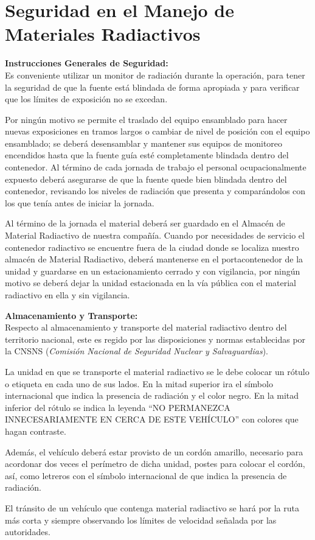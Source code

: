 \section*{Seguridad en el Manejo de Materiales Radiactivos}

\textbf{Instrucciones Generales de Seguridad:} \\
Es conveniente utilizar un monitor de radiación durante la operación, para tener la seguridad de que la fuente está blindada de forma apropiada y para verificar que los límites de exposición no se excedan.

Por ningún motivo se permite el traslado del equipo ensamblado para hacer nuevas exposiciones en tramos largos o cambiar de nivel de posición con el equipo ensamblado; se deberá desensamblar y mantener sus equipos de monitoreo encendidos hasta que la fuente guía esté completamente blindada dentro del contenedor. Al término de cada jornada de trabajo el personal ocupacionalmente expuesto deberá asegurarse de que la fuente quede bien blindada dentro del contenedor, revisando los niveles de radiación que presenta y comparándolos con los que tenía antes de iniciar la jornada.

Al término de la jornada el material deberá ser guardado en el Almacén de Material Radiactivo de nuestra compañía. Cuando por necesidades de servicio el contenedor radiactivo se encuentre fuera de la ciudad donde se localiza nuestro almacén de Material Radiactivo, deberá mantenerse en el portacontenedor de la unidad y guardarse en un estacionamiento cerrado y con vigilancia, por ningún motivo se deberá dejar la unidad estacionada en la vía pública con el material radiactivo en ella y sin vigilancia.

\textbf{Almacenamiento y Transporte:} \\
Respecto al almacenamiento y transporte del material radiactivo dentro del territorio nacional, este es regido por las disposiciones y normas establecidas por la CNSNS (\textit{Comisión Nacional de Seguridad Nuclear y Salvaguardias}).

La unidad en que se transporte el material radiactivo se le debe colocar un rótulo o etiqueta en cada uno de sus lados. En la mitad superior ira el símbolo internacional que indica la presencia de radiación y el color negro. En la mitad inferior del rótulo se indica la leyenda ``NO PERMANEZCA INNECESARIAMENTE EN CERCA DE ESTE VEHÍCULO'' con colores que hagan contraste.

Además, el vehículo deberá estar provisto de un cordón amarillo, necesario para acordonar dos veces el perímetro de dicha unidad, postes para colocar el cordón, así, como letreros con el símbolo internacional de que indica la presencia de radiación.

El tránsito de un vehículo que contenga material radiactivo se hará por la ruta más corta y siempre observando los límites de velocidad señalada por las autoridades.